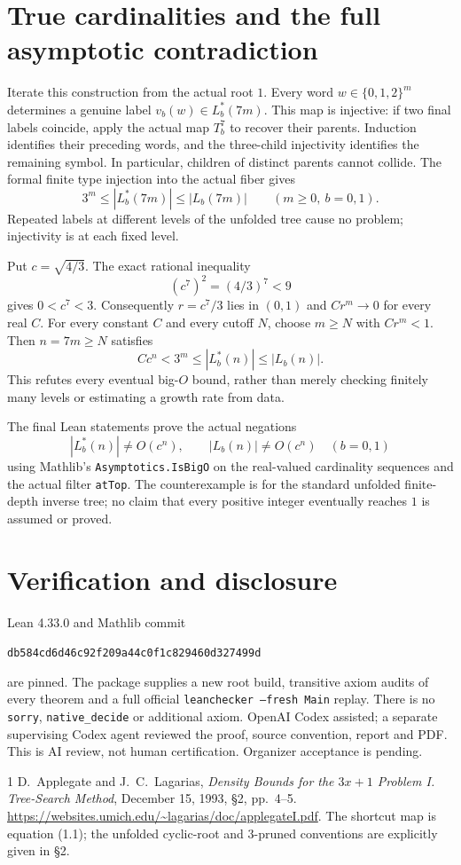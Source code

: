 \documentclass[11pt]{article}
\begin{document}
\newpage
\section{True cardinalities and the full asymptotic contradiction}
Iterate this construction from the actual root $1$. Every word
$w\in\{0,1,2\}^m$ determines a genuine label
$v_b(w)\in L_b^*(7m)$. This map is injective: if two final labels
coincide, apply the actual map $T_b^7$ to recover their parents.
Induction identifies their preceding words, and the three-child
injectivity identifies the remaining symbol. In particular,
children of distinct parents cannot collide. The formal finite
type injection into the actual fiber gives
\[
 3^m\le |L_b^*(7m)|\le |L_b(7m)|\qquad(m\ge0,\ b=0,1).
\]
Repeated labels at different levels of the unfolded tree cause
no problem; injectivity is at each fixed level.

Put $c=\sqrt{4/3}$. The exact rational inequality
\[
 (c^7)^2=(4/3)^7<9
\]
gives $0<c^7<3$. Consequently $r=c^7/3$ lies in $(0,1)$ and
$C r^m\longrightarrow0$ for every real $C$.
For every constant $C$ and every cutoff $N$, choose $m\ge N$
with $C r^m<1$. Then $n=7m\ge N$ satisfies
\[
 Cc^n<3^m\le |L_b^*(n)|\le |L_b(n)|.
\]
This refutes every eventual big-$O$ bound, rather than merely
checking finitely many levels or estimating a growth rate from data.

The final Lean statements prove the actual negations
\[
 |L_b^*(n)|\not=O(c^n),\qquad |L_b(n)|\not=O(c^n)
 \quad(b=0,1)
\]
using Mathlib's \texttt{Asymptotics.IsBigO} on the real-valued
cardinality sequences and the actual filter \texttt{atTop}.
The counterexample is for the standard unfolded finite-depth
inverse tree; no claim that every positive integer eventually
reaches $1$ is assumed or proved.

\section{Verification and disclosure}
Lean 4.33.0 and Mathlib commit
\begin{center}\small\texttt{db584cd6d46c92f209a44c0f1c829460d327499d}\end{center}
are pinned. The package supplies a new root build, transitive
axiom audits of every theorem and a full official
\texttt{leanchecker --fresh Main} replay. There is no
\texttt{sorry}, \texttt{native\_decide} or additional axiom.
OpenAI Codex assisted; a separate supervising Codex agent
reviewed the proof, source convention, report and PDF. This is AI
review, not human certification. Organizer acceptance is pending.

\begin{thebibliography}{1}
 D.~Applegate and J.~C.~Lagarias,
\emph{Density Bounds for the $3x+1$ Problem I. Tree-Search Method},
December 15, 1993, \S2, pp.~4--5.
\url{https://websites.umich.edu/~lagarias/doc/applegateI.pdf}.
The shortcut map is equation (1.1); the unfolded cyclic-root and
$3$-pruned conventions are explicitly given in \S2.
\end{thebibliography}
\end{document}
